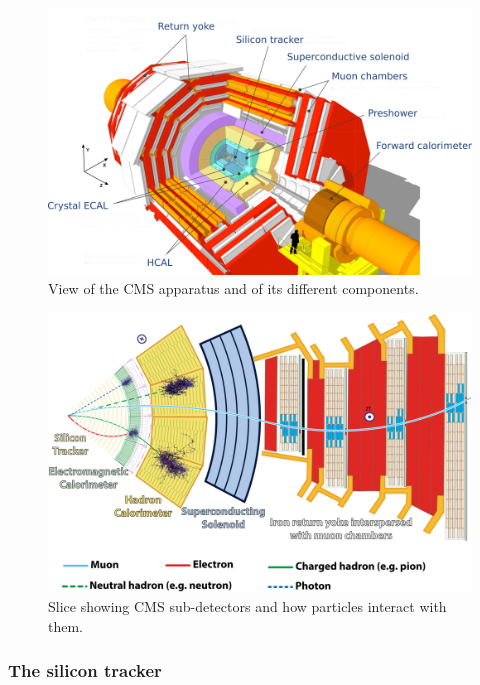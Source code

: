 \endgroup
	
	\begin{figure}[H]
		\centering
		\includegraphics[width=0.75\linewidth]{fig/chapt2/CMS_detail.pdf}
		\caption{\label{fig:CMS-detail} View of the CMS apparatus and of its different components.}
	\end{figure}
	
	\begin{figure}[H]
		\centering
		\includegraphics[width=0.8\linewidth]{fig/chapt2/CMS_slice.png}
		\caption{\label{fig:CMS-slice} Slice showing CMS sub-detectors and how particles interact with them.}
	\end{figure}
	
		\subsubsection{The silicon tracker}
		\label{chapt2:sssec:tracker}
	
\begingroup\setlength{\intextsep}{5pt}\setlength{\columnsep}{15pt}
	
